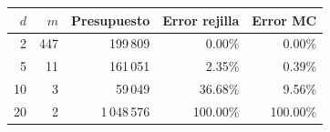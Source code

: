 \begin{tabular}{rrrrr}
\toprule
$d$ & $m$ & Presupuesto & Error rejilla & Error MC \\
\midrule
2 & 447 & 199\,809 & 0.00\% & 0.00\% \\
5 & 11 & 161\,051 & 2.35\% & 0.39\% \\
10 & 3 & 59\,049 & 36.68\% & 9.56\% \\
20 & 2 & 1\,048\,576 & 100.00\% & 100.00\% \\
\bottomrule
\end{tabular}
